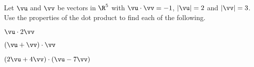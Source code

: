\begin{activity} \label{A:1.3.3}  Let $\vu$ and $\vv$ be vectors in $\R^5$ with $\vu \cdot \vv = -1$, $| \vu | = 2$ and $| \vv | = 3$. Use the properties of the dot product to find each of the following.
    \ba
    \item $\vu \cdot 2\vv$

    \item $(\vu + \vv) \cdot \vv$

    \item $(2\vu+4\vv) \cdot (\vu - 7\vv)$

    \ea
\end{activity}
\begin{smallhint}

\end{smallhint}
\begin{bighint}

\end{bighint}
\begin{activitySolution}

\end{activitySolution}
\aftera
